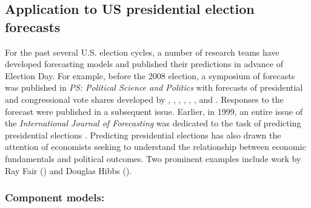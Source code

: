 \subsection{Application to US presidential election forecasts}
For the past several U.S. election cycles, a number of research teams
have developed forecasting models and published their predictions in
advance of Election Day.  For example, before the 2008 election, a
symposium of forecasts was published in \emph{PS: Political Science
  and Politics} with forecasts of presidential and congressional vote
shares developed by \citet{Campbell:2008}, \citet{Norpoth:2008},
\citet{Lewis-Beck:Tien:2008}, \citet{Abramowitz:2008},
\citet{Erikson:Wlezien:2008}, \citet{Holbrook:2008},
\citet{Lockerbie:2008} and \citet{Cuzan:Bundrick:2008}.  Responses to
the forecast were published in a subsequent issue. Earlier, in 1999,
an entire issue of the \textit{International Journal of Forecasting}
was dedicated to the task of predicting presidential elections
\citep{Brown:1999}.  Predicting presidential elections has also drawn
the attention of economists seeking to understand the relationship
between economic fundamentals and political outcomes.  Two prominent
examples include work by Ray Fair (\citeyear{Fair:2010}) and Douglas
Hibbs (\citeyear{Hibbs:2000}).

\subsubsection{Component models:}

